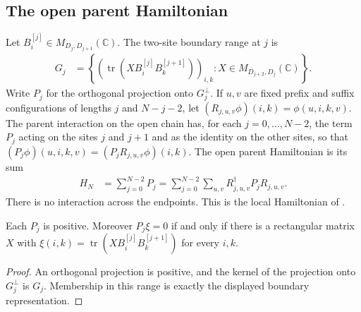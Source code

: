 \subsection{The open parent Hamiltonian}

\begin{definition}
    \label{def:varying_obc_parent_projectors}
    \leanok
    Let $B^{[j]}_i\in M_{D_j,D_{j+1}}(\mathbb C)$. The two-site
    boundary range at $j$ is
    \begin{align}
        G_j & =\left\{\left(\operatorname{tr}
        (XB^{[j]}_iB^{[j+1]}_k)\right)_{i,k}:
        X\in M_{D_{j+2},D_j}(\mathbb C)\right\}.
    \end{align}
    Write $P_j$ for the orthogonal projection onto $G_j^\perp$.
    If $u,v$ are fixed prefix and suffix configurations of lengths $j$ and
    $N-j-2$, let $(R_{j,u,v}\phi)(i,k)=\phi(u,i,k,v)$. The parent interaction
    on the open chain has, for each $j=0,\ldots,N-2$, the term $P_j$ acting on
    the sites $j$ and $j+1$ and as the identity on the other sites, so that
    $(P_j\phi)(u,i,k,v)=(P_jR_{j,u,v}\phi)(i,k)$. The open parent
    Hamiltonian is its sum
    \begin{align}
        H_N & =\sum_{j=0}^{N-2}P_j
        =\sum_{j=0}^{N-2}\sum_{u,v}R_{j,u,v}^\dagger P_jR_{j,u,v}.
    \end{align}
    There is no interaction across the endpoints.
    This is the local Hamiltonian of
    \cite[Theorem~9, lines~1201--1217]{PerezGarcia2007Matrix}.
\end{definition}

\begin{lemma}
    \label{lem:varying_obc_pair_projector_kernel}
    \leanok
    Each $P_j$ is positive. Moreover $P_j\xi=0$ if and only if there is a
    rectangular matrix $X$ with
    $\xi(i,k)=\operatorname{tr}(XB^{[j]}_iB^{[j+1]}_k)$ for every $i,k$.
\end{lemma}
\begin{proof}\leanok
    An orthogonal projection is positive, and the kernel of the projection
    onto $G_j^\perp$ is $G_j$. Membership in this range is exactly the
    displayed boundary representation.
\end{proof}

